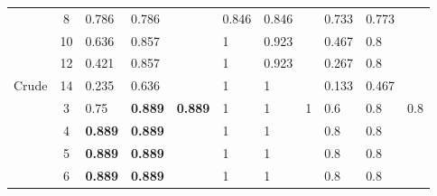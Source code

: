 \begin{table}[]
\begin{tabular}{|c|c|l|l|l|l|l|l|l|l|l|}
                        & 8                     & \cellcolor[HTML]{EFEFEF}0.786          & \cellcolor[HTML]{EFEFEF}0.786          & \cellcolor[HTML]{EFEFEF}               & 0.846    & 0.846    &          & \cellcolor[HTML]{EFEFEF}0.733 & \cellcolor[HTML]{EFEFEF}0.773 & \cellcolor[HTML]{EFEFEF}      \\ \cline{2-11} 
                        & 10                    & \cellcolor[HTML]{EFEFEF}0.636          & \cellcolor[HTML]{EFEFEF}0.857          & \cellcolor[HTML]{EFEFEF}               & 1        & 0.923    &          & \cellcolor[HTML]{EFEFEF}0.467 & \cellcolor[HTML]{EFEFEF}0.8   & \cellcolor[HTML]{EFEFEF}      \\ \cline{2-11} 
                        & 12                    & \cellcolor[HTML]{EFEFEF}0.421          & \cellcolor[HTML]{EFEFEF}0.857          & \cellcolor[HTML]{EFEFEF}               & 1        & 0.923    &          & \cellcolor[HTML]{EFEFEF}0.267 & \cellcolor[HTML]{EFEFEF}0.8   & \cellcolor[HTML]{EFEFEF}      \\ \cline{2-11} 
\multirow{-9}{*}{Crude} & 14                    & \cellcolor[HTML]{EFEFEF}0.235          & \cellcolor[HTML]{EFEFEF}0.636          & \cellcolor[HTML]{EFEFEF}               & 1        & 1        &          & \cellcolor[HTML]{EFEFEF}0.133 & \cellcolor[HTML]{EFEFEF}0.467 & \cellcolor[HTML]{EFEFEF}      \\ \hline
                        & 3                     & \cellcolor[HTML]{EFEFEF}0.75           & \cellcolor[HTML]{EFEFEF}\textbf{0.889} & \cellcolor[HTML]{EFEFEF}\textbf{0.889} & 1        & 1        & 1        & \cellcolor[HTML]{EFEFEF}0.6   & \cellcolor[HTML]{EFEFEF}0.8   & \cellcolor[HTML]{EFEFEF}0.8   \\ \cline{2-11} 
                        & 4                     & \cellcolor[HTML]{EFEFEF}\textbf{0.889} & \cellcolor[HTML]{EFEFEF}\textbf{0.889} & \cellcolor[HTML]{EFEFEF}               & 1        & 1        &          & \cellcolor[HTML]{EFEFEF}0.8   & \cellcolor[HTML]{EFEFEF}0.8   & \cellcolor[HTML]{EFEFEF}      \\ \cline{2-11} 
                        & 5                     & \cellcolor[HTML]{EFEFEF}\textbf{0.889} & \cellcolor[HTML]{EFEFEF}\textbf{0.889} & \cellcolor[HTML]{EFEFEF}               & 1        & 1        &          & \cellcolor[HTML]{EFEFEF}0.8   & \cellcolor[HTML]{EFEFEF}0.8   & \cellcolor[HTML]{EFEFEF}      \\ \cline{2-11} 
                        & 6                     & \cellcolor[HTML]{EFEFEF}\textbf{0.889} & \cellcolor[HTML]{EFEFEF}\textbf{0.889} & \cellcolor[HTML]{EFEFEF}               & 1        & 1        &          & \cellcolor[HTML]{EFEFEF}0.8   & \cellcolor[HTML]{EFEFEF}0.8   & \cellcolor[HTML]{EFEFEF}      \\ \cline{2-11} 

\end{tabular}
\end{table}
